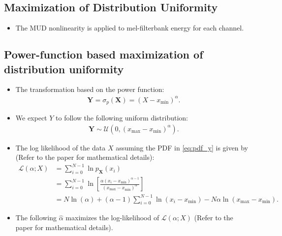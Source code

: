 \documentclass[a0,portrait]{a0poster}
\begin{document}
\begin{multicols}{2}
  \section{Maximization of Distribution Uniformity}

\begin{itemize}
  \item The MUD nonlinearity is applied to mel-filterbank energy for each channel.
\end{itemize}

\subsection{Power-function based maximization of distribution
uniformity}
%
\begin{itemize}
\item The transformation based on the power function:
\begin{align}
  \mathbf{Y} = \sigma_{p} \left(\mathbf{X} \right) = (X - x_{\text{min}})^{\alpha}.
    \label{eq:power_mud}
\end{align}
%
\item We expect $Y$ to follow the following uniform distribution:
\begin{align}
 \mathbf{Y} \sim 
  \mathcal{U}(0, \left(x_{\text{max}} - x_{\text{min}} \right)^{\alpha} ).
    \label{eq:pdf_y}
\end{align}
%
\item
The log likelihood of the data $X$ assuming the PDF in \eqref{eq:pdf_y}
is given by (Refer to the paper for mathematical details):
%
%
\begin{align}
  \mathcal{L}\left(\alpha ; X\right) 
      & = \sum_{i=0}^{N-1} \ln p_{\mathbf{X}} \left( x_i \right)  \nonumber \\
      & = \sum_{i=0}^{N-1} 
              \ln \left[ \frac{ \alpha (x_i - x_{\text{min}} )^{\alpha-1}}  
              {\left(x_{\text{max}} - x_{\text{min}} \right)^{\alpha}} \right]  \nonumber \\
      & = N \ln(\alpha) + \left(\alpha-1 \right) \sum_{i=0}^{N-1}
        \ln \left(x_i - x_{\text{min}} \right)  
       - N \alpha \ln \left(x_{\text{max}} - x_{\text{min}} \right).
        \label{eq:x_likelihood}
\end{align}
%
%
%
%
%
\item 
%
The following $\hat{\alpha}$ maximizes the log-likelihood of $\mathcal{L}\left(\alpha ; X\right)$
(Refer to the paper for mathematical details).
%
%
\begin{align}

\end{align}
\end{itemize}
\end{multicols}
\end{document}
